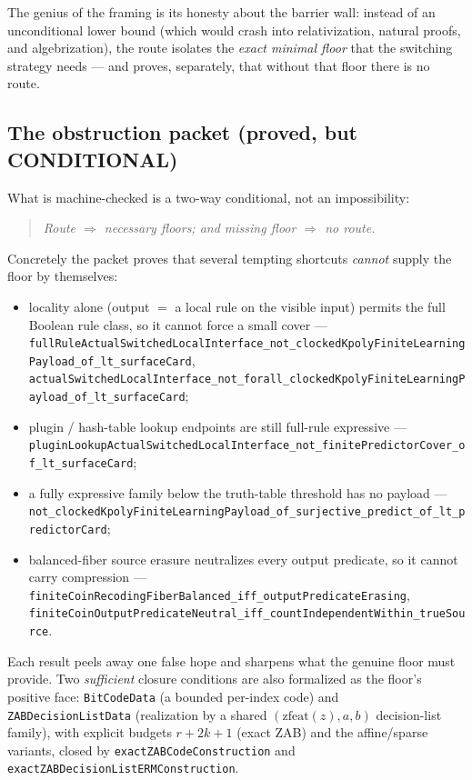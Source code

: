 The genius of the framing is its honesty about the barrier wall: instead of an
unconditional lower bound (which would crash into relativization, natural
proofs, and algebrization), the route isolates the \emph{exact minimal floor}
that the switching strategy needs --- and proves, separately, that without that
floor there is no route.

\subsection{The obstruction packet (proved, but CONDITIONAL)}

What is machine-checked is a two-way conditional, not an impossibility:
\begin{quote}
\emph{Route $\Longrightarrow$ necessary floors; and missing floor
$\Longrightarrow$ no route.}
\end{quote}
Concretely the packet proves that several tempting shortcuts \emph{cannot}
supply the floor by themselves:
\begin{itemize}\itemsep1pt
  \item locality alone (output $=$ a local rule on the visible input) permits
    the full Boolean rule class, so it cannot force a small cover ---
    \verb|fullRuleActualSwitchedLocalInterface_not_clockedKpolyFiniteLearningPayload_of_lt_surfaceCard|,
    \verb|actualSwitchedLocalInterface_not_forall_clockedKpolyFiniteLearningPayload_of_lt_surfaceCard|;
  \item plugin / hash-table lookup endpoints are still full-rule expressive ---
    \verb|pluginLookupActualSwitchedLocalInterface_not_finitePredictorCover_of_lt_surfaceCard|;
  \item a fully expressive family below the truth-table threshold has no payload
    --- \verb|not_clockedKpolyFiniteLearningPayload_of_surjective_predict_of_lt_predictorCard|;
  \item balanced-fiber source erasure neutralizes every output predicate, so it
    cannot carry compression ---
    \verb|finiteCoinRecodingFiberBalanced_iff_outputPredicateErasing|,
    \verb|finiteCoinOutputPredicateNeutral_iff_countIndependentWithin_trueSource|.
\end{itemize}
Each result peels away one false hope and sharpens what the genuine floor must
provide. Two \emph{sufficient} closure conditions are also formalized as the
floor's positive face: \verb|BitCodeData| (a bounded per-index code) and
\verb|ZABDecisionListData| (realization by a shared
$(\mathrm{zfeat}(z),a,b)$ decision-list family), with explicit budgets
$r+2k+1$ (exact ZAB) and the affine/sparse variants, closed by
\verb|exactZABCodeConstruction| and \verb|exactZABDecisionListERMConstruction|.

